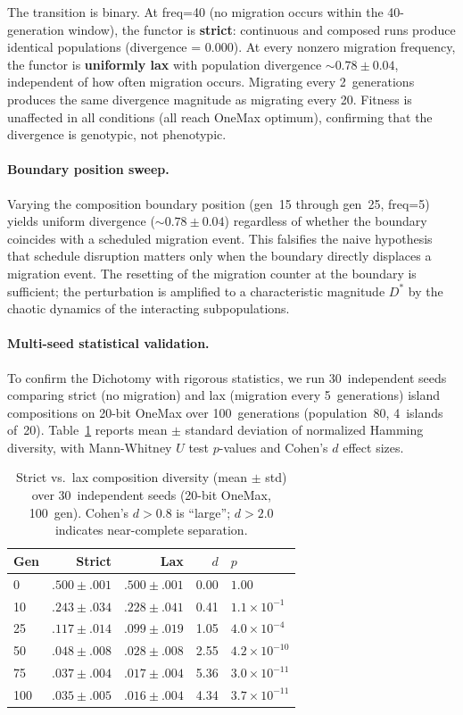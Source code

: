 \documentclass[sigconf]{acmart}
\begin{document}
The transition is binary. At freq=40 (no migration occurs within the 40-generation window), the functor is \textbf{strict}: continuous and composed runs produce identical populations (divergence = 0.000). At every nonzero migration frequency, the functor is \textbf{uniformly lax} with population divergence ${\sim}0.78 \pm 0.04$, independent of how often migration occurs. Migrating every 2~generations produces the same divergence magnitude as migrating every 20. Fitness is unaffected in all conditions (all reach OneMax optimum), confirming that the divergence is genotypic, not phenotypic.

\paragraph{Boundary position sweep.}
Varying the composition boundary position (gen~15 through gen~25, freq=5) yields uniform divergence (${\sim}0.78 \pm 0.04$) regardless of whether the boundary coincides with a scheduled migration event. This falsifies the naive hypothesis that schedule disruption matters only when the boundary directly displaces a migration event. The resetting of the migration counter at the boundary is sufficient; the perturbation is amplified to a characteristic magnitude $D^*$ by the chaotic dynamics of the interacting subpopulations.

\paragraph{Multi-seed statistical validation.}
To confirm the Dichotomy with rigorous statistics, we run 30~independent seeds comparing strict (no migration) and lax (migration every 5~generations) island compositions on 20-bit OneMax over 100~generations (population~80, 4~islands of~20). Table~\ref{tab:multiseed} reports mean $\pm$ standard deviation of normalized Hamming diversity, with Mann-Whitney $U$ test $p$-values and Cohen's $d$ effect sizes.

\begin{table}[ht]
\centering
\caption{Strict vs.\ lax composition diversity (mean $\pm$ std) over 30~independent seeds (20-bit OneMax, 100~gen). Cohen's $d > 0.8$ is ``large''; $d > 2.0$ indicates near-complete separation.}
\label{tab:multiseed}
\small
\begin{tabular}{@{}lrrrl@{}}
\toprule
\textbf{Gen} & \textbf{Strict} & \textbf{Lax} & \textbf{$d$} & \textbf{$p$} \\
\midrule
0   & $.500 \pm .001$ & $.500 \pm .001$ & 0.00 & $1.00$ \\
10  & $.243 \pm .034$ & $.228 \pm .041$ & 0.41 & $1.1{\times}10^{-1}$ \\
25  & $.117 \pm .014$ & $.099 \pm .019$ & 1.05 & $4.0{\times}10^{-4}$ \\
50  & $.048 \pm .008$ & $.028 \pm .008$ & 2.55 & $4.2{\times}10^{-10}$ \\
75  & $.037 \pm .004$ & $.017 \pm .004$ & 5.36 & $3.0{\times}10^{-11}$ \\
100 & $.035 \pm .005$ & $.016 \pm .004$ & 4.34 & $3.7{\times}10^{-11}$ \\
\bottomrule
\end{tabular}
\end{table}
\end{document}
